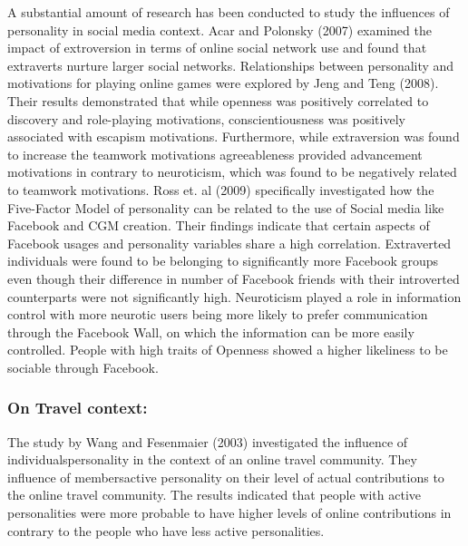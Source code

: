 A substantial amount of research has been conducted to study the influences of personality in social media context. Acar and Polonsky (2007) examined the impact of extroversion in terms of online social network use and found that extraverts nurture larger social networks\cite{acar2007online}. Relationships between personality and motivations for playing online games were explored by Jeng and Teng (2008)\cite{jeng2008personality}. Their results demonstrated that while openness was positively correlated to discovery and role-playing motivations, conscientiousness was positively associated with escapism motivations. Furthermore, while extraversion was found to increase the teamwork motivations agreeableness provided advancement motivations in contrary to neuroticism, which was found to be negatively related to teamwork motivations. Ross et. al (2009) specifically investigated how the Five-Factor Model of personality can be related to the use of Social media like Facebook and CGM creation. Their findings indicate that certain aspects of Facebook usages and personality variables share a high correlation. Extraverted individuals were found to be belonging to significantly more Facebook groups even though their difference in number of Facebook friends with their introverted counterparts were not significantly high. Neuroticism played a role in information control with more neurotic users being more likely to prefer communication through the Facebook Wall, on which the information can be more easily controlled. People with high traits of Openness showed a higher likeliness to be sociable through Facebook\cite{ross2009personality}. 


\subsubsection{On Travel context: }\label{3.3}

The study by Wang and Fesenmaier (2003) investigated the influence of individuals\textquotesingle personality in the context of an online travel community. They influence of members\textquotesingle active personality on their level of actual contributions to the online travel community. The results indicated that people with active personalities were more probable to have higher levels of online contributions in contrary to the people who have less active personalities.


